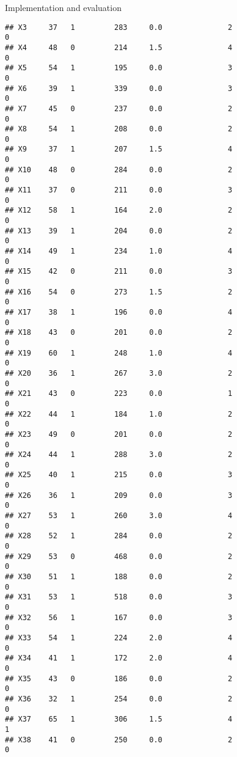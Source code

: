 \documentclass[
  ignorenonframetext,
]{beamer}
\begin{document}
\begin{frame}[fragile]{Implementation and evaluation}
\begin{verbatim}
## X3     37   1         283     0.0               2                   0
## X4     48   0         214     1.5               4                   0
## X5     54   1         195     0.0               3                   0
## X6     39   1         339     0.0               3                   0
## X7     45   0         237     0.0               2                   0
## X8     54   1         208     0.0               2                   0
## X9     37   1         207     1.5               4                   0
## X10    48   0         284     0.0               2                   0
## X11    37   0         211     0.0               3                   0
## X12    58   1         164     2.0               2                   0
## X13    39   1         204     0.0               2                   0
## X14    49   1         234     1.0               4                   0
## X15    42   0         211     0.0               3                   0
## X16    54   0         273     1.5               2                   0
## X17    38   1         196     0.0               4                   0
## X18    43   0         201     0.0               2                   0
## X19    60   1         248     1.0               4                   0
## X20    36   1         267     3.0               2                   0
## X21    43   0         223     0.0               1                   0
## X22    44   1         184     1.0               2                   0
## X23    49   0         201     0.0               2                   0
## X24    44   1         288     3.0               2                   0
## X25    40   1         215     0.0               3                   0
## X26    36   1         209     0.0               3                   0
## X27    53   1         260     3.0               4                   0
## X28    52   1         284     0.0               2                   0
## X29    53   0         468     0.0               2                   0
## X30    51   1         188     0.0               2                   0
## X31    53   1         518     0.0               3                   0
## X32    56   1         167     0.0               3                   0
## X33    54   1         224     2.0               4                   0
## X34    41   1         172     2.0               4                   0
## X35    43   0         186     0.0               2                   0
## X36    32   1         254     0.0               2                   0
## X37    65   1         306     1.5               4                   1
## X38    41   0         250     0.0               2                   0

\end{verbatim}
\end{frame}
\end{document}
